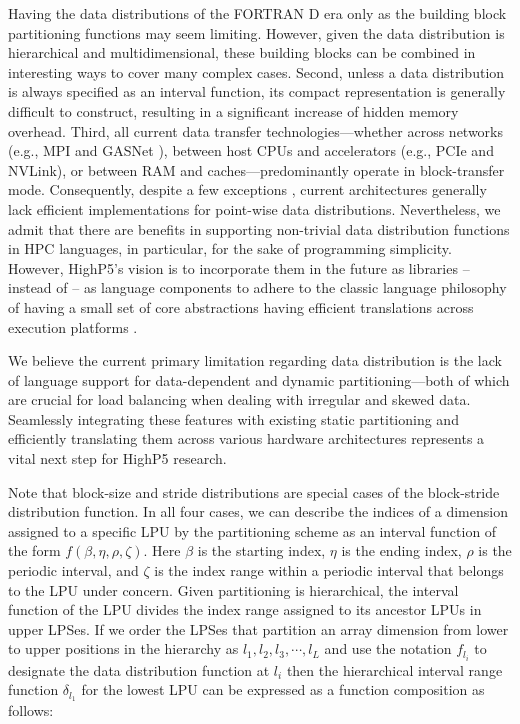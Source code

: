 \documentclass[ASNA,twocolumn]{USG} %
\begin{document}
{{\color{red}
Having the data distributions of the FORTRAN D era only as the building block partitioning functions may seem limiting. However, given the data distribution is hierarchical and multidimensional, these building blocks can be combined in interesting ways to cover many complex cases. Second, unless a data distribution is always specified as an interval function, its compact representation is generally difficult to construct, resulting in a significant increase of hidden memory overhead. Third, all current data transfer technologies—whether across networks (e.g., MPI and GASNet \citep{10.1007/978-3-030-34627-0_11}), between host CPUs and accelerators (e.g., PCIe and NVLink), or between RAM and caches—predominantly operate in block-transfer mode. Consequently, despite a few exceptions \citep{gropp1999improving}, current architectures generally lack efficient implementations for point-wise data distributions. Nevertheless, we admit that there are benefits in supporting non-trivial data distribution functions in HPC languages, in particular, for the sake of programming simplicity. However, HighP5's vision is to incorporate them in the future as libraries -- instead of -- as language components to adhere to the classic language philosophy of having a small set of core abstractions having efficient translations across execution platforms \citep{wirth1974design}.

We believe the current primary limitation regarding data distribution is the lack of language support for data-dependent and dynamic partitioning—both of which are crucial for load balancing when dealing with irregular and skewed data. Seamlessly integrating these features with existing static partitioning and efficiently translating them across various hardware architectures represents a vital next step for HighP5 research.   
} 

Note that block-size and stride distributions are special cases of the block-stride distribution function. In all four cases, we can describe the indices of a dimension assigned to a specific LPU by the partitioning scheme as an interval function of the form $f(\beta, \eta, \rho, \zeta)$. Here $\beta$ is the starting index, $\eta$ is the ending index, $\rho$ is the periodic interval, and $\zeta$ is the index range within a periodic interval that belongs to the LPU under concern. Given partitioning is hierarchical, the interval function of the LPU divides the index range assigned to its ancestor LPUs in upper LPSes. If we order the LPSes that partition an array dimension from lower to upper positions in the hierarchy as $l_1, l_2, l_3, \cdots, l_L$ and use the notation $f_{l_i}$ to designate the data distribution function at $l_i$ then the hierarchical interval range function $\delta_{l_1}$ for the lowest LPU can be expressed as a function composition as follows: 

}
\end{document}
